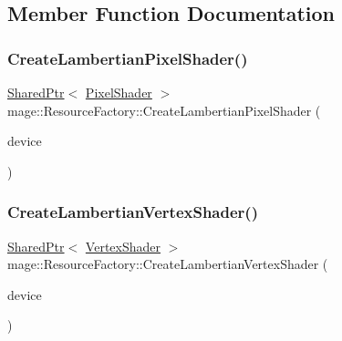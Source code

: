 \subsection{Member Function Documentation}
\hypertarget{classmage_1_1_resource_factory_aa547e0dac336a2ac48eb92d399d929be}{}\label{classmage_1_1_resource_factory_aa547e0dac336a2ac48eb92d399d929be} 
\subsubsection{\texorpdfstring{Create\+Lambertian\+Pixel\+Shader()}{CreateLambertianPixelShader()}}
{\footnotesize\ttfamily \hyperlink{namespacemage_a1e01ae66713838a7a67d30e44c67703e}{Shared\+Ptr}$<$ \hyperlink{classmage_1_1_pixel_shader}{Pixel\+Shader} $>$ mage\+::\+Resource\+Factory\+::\+Create\+Lambertian\+Pixel\+Shader (\begin{DoxyParamCaption}\item[{const \hyperlink{classmage_1_1_rendering_device}{Rendering\+Device} \&}]{device }\end{DoxyParamCaption})}

\hypertarget{classmage_1_1_resource_factory_af5771b81adf517c1ff174252994e02b9}{}\label{classmage_1_1_resource_factory_af5771b81adf517c1ff174252994e02b9} 
\subsubsection{\texorpdfstring{Create\+Lambertian\+Vertex\+Shader()}{CreateLambertianVertexShader()}}
{\footnotesize\ttfamily \hyperlink{namespacemage_a1e01ae66713838a7a67d30e44c67703e}{Shared\+Ptr}$<$ \hyperlink{classmage_1_1_vertex_shader}{Vertex\+Shader} $>$ mage\+::\+Resource\+Factory\+::\+Create\+Lambertian\+Vertex\+Shader (\begin{DoxyParamCaption}\item[{const \hyperlink{classmage_1_1_rendering_device}{Rendering\+Device} \&}]{device }\end{DoxyParamCaption})}

